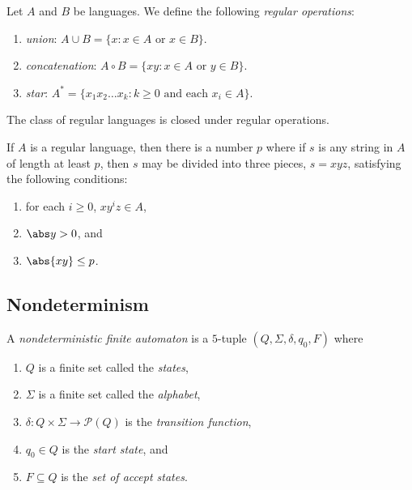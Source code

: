 \documentclass{article}
\begin{document}
\begin{definition*}
	Let $A$ and $B$ be languages. We define the following \emph{regular operations}:
	\begin{enumerate}
		\item \emph{union}: $A\cup B=\{x : x \in A \text{ or } x \in B\}$.
		\item \emph{concatenation}: $A\circ B=\{xy : x \in A \text{ or } y \in B\}$.
		\item \emph{star}: $A^* = \{x_1x_2\dots x_k:k\geq 0 \text{ and each }x_i\in A\}$.
	\end{enumerate}
\end{definition*}

\begin{theorem*}[Sipser p. 45, 60, 62]
	The class of regular languages is closed under regular operations.
\end{theorem*}

\begin{theorem*}
	If $A$ is a regular language, then there is a number $p$ where if $s$
	is any string in $A$ of length at least $p$, then $s$ may be divided
	into three pieces, $s=xyz$, satisfying the following conditions:
	\begin{enumerate}
		\item for each $i\geq 0$, $xy^iz\in A$,
		\item $\abs y > 0$, and
		\item $\abs{xy} \leq p$.
	\end{enumerate}
\end{theorem*}

\subsection{Nondeterminism}

\begin{definition*}
	A \emph{nondeterministic finite automaton} is a $5$-tuple $(Q,\Sigma,\delta,q_0,F)$ where
	\begin{enumerate}
		\item $Q$ is a finite set called the \emph{states},
		\item $\Sigma$ is a finite set called the \emph{alphabet},
		\item $\delta:Q\times\Sigma\to\mathcal{P}(Q)$ is the \emph{transition function},
		\item $q_0\in Q$ is the \emph{start state}, and
		\item $F\subseteq Q$ is the \emph{set of accept states}.
	\end{enumerate}
\end{definition*}
\end{document}
